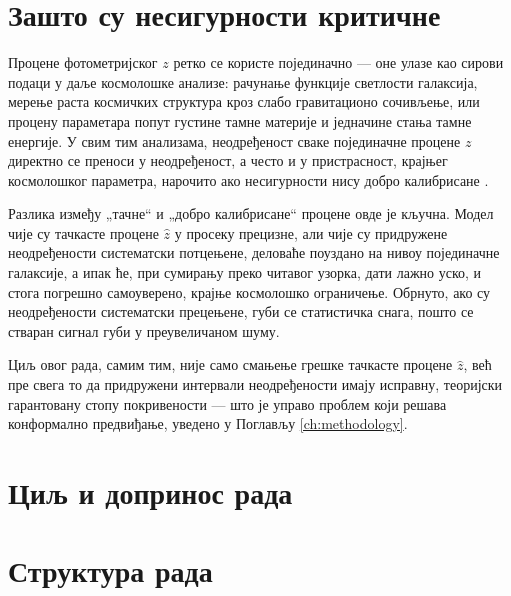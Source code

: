 \documentclass[12pt,oneside]{memoir}
\begin{document}
\section{Зашто су несигурности критичне}

Процене фотометријског $z$ ретко се користе појединачно — оне улазе као
сирови подаци у даље космолошке анализе: рачунање функције светлости
галаксија, мерење раста космичких структура кроз слабо гравитационо
сочивљење, или процену параметара попут густине тамне материје и једначине
стања тамне енергије. У свим тим анализама, неодређеност сваке појединачне
процене $z$ директно се преноси у неодређеност, а често и у пристрасност,
крајњег космолошког параметра, нарочито ако несигурности нису добро
калибрисане \cite{jones2024b}.

Разлика између „тачне“ и „добро калибрисане“ процене овде је кључна. Модел
чије су тачкасте процене $\hat z$ у просеку прецизне, али чије су
придружене неодређености систематски потцењене, деловаће поуздано на нивоу
појединачне галаксије, а ипак ће, при сумирању преко читавог узорка, дати
лажно уско, и стога погрешно самоуверено, крајње космолошко ограничење.
Обрнуто, ако су неодређености систематски прецењене, губи се статистичка
снага, пошто се стваран сигнал губи у преувеличаном шуму.

Циљ овог рада, самим тим, није само смањење грешке тачкасте процене $\hat
z$, већ пре свега то да придружени интервали неодређености имају исправну,
теоријски гарантовану стопу покривености — што је управо проблем који
решава конформално предвиђање, уведено у Поглављу \ref{ch:methodology}.


\section{Циљ и допринос рада}


\section{Структура рада}


\end{document}
